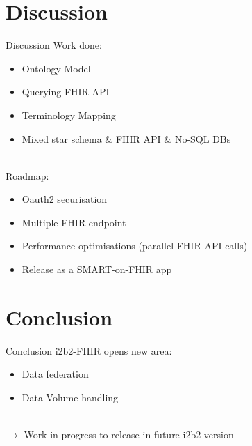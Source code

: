 \documentclass[10pt]{beamer}
\begin{document}
\section{Discussion}
\begin{frame}{Discussion}{}
Work done:
\begin{itemize}
\item Ontology Model
\item Querying FHIR API
\item Terminology Mapping
\item Mixed star schema \& FHIR API \& No-SQL DBs
\end{itemize}
~
	\\
	Roadmap:
\begin{itemize}
\item Oauth2 securisation
\item Multiple FHIR endpoint 
\item Performance optimisations (parallel FHIR API calls)
\item Release as a SMART-on-FHIR app 
\end{itemize}
\end{frame}

\section{Conclusion}
\begin{frame}{Conclusion}{}
	i2b2-FHIR opens new area:
\begin{itemize}
\item Data federation
\item Data Volume handling
\end{itemize}
~\\
$\rightarrow$ Work in progress to release in future i2b2 version
\end{frame}

{\1
\begin{frame}
\end{frame}}
\end{document}
